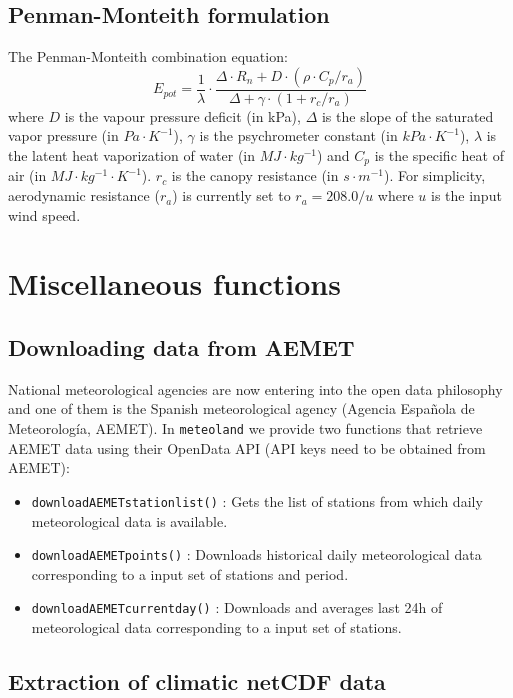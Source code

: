 \documentclass[11pt,a4paper]{article}
\begin{document}
\subsection{Penman-Monteith formulation}
The Penman-Monteith combination equation:
\begin{equation}
E_{pot} = \frac{1}{\lambda} \cdot \frac{\Delta \cdot R_{n} + D \cdot (\rho \cdot C_p/r_a)}{\Delta + \gamma \cdot (1 + r_c/r_a)}
\end{equation}
where  $D$ is the vapour pressure deficit (in kPa), $\Delta$  is the slope of the saturated vapor pressure (in $Pa \cdot K^{-1}$), $\gamma$ is the psychrometer constant (in $kPa\cdot K^{-1}$), $\lambda$ is the latent heat vaporization of water (in $MJ\cdot kg^{-1}$) and $C_p$ is the specific heat of air (in $MJ\cdot kg^{-1}\cdot K^{-1}$). $r_c$ is the canopy resistance (in $s\cdot m^{-1}$). For simplicity, aerodynamic resistance ($r_a$) is currently set to $r_a = 208.0/u$ where $u$ is the input wind speed.  

\section{Miscellaneous functions}
\subsection{Downloading data from AEMET}

National meteorological agencies are now entering into the open data philosophy and one of them is the Spanish meteorological agency (Agencia Española de Meteorología, AEMET). In \texttt{meteoland} we provide two functions that retrieve AEMET data using their OpenData API (API keys need to be obtained from AEMET):
\begin{itemize}
\item{\texttt{downloadAEMETstationlist()} : Gets the list of stations from which daily meteorological data is available.}
\item{\texttt{downloadAEMETpoints()} : Downloads historical daily meteorological data corresponding to a input set of stations and period.}
\item{\texttt{downloadAEMETcurrentday()} : Downloads and averages last 24h of meteorological data corresponding to a input set of stations.}
\end{itemize}


\subsection{Extraction of climatic netCDF data}
\end{document}
